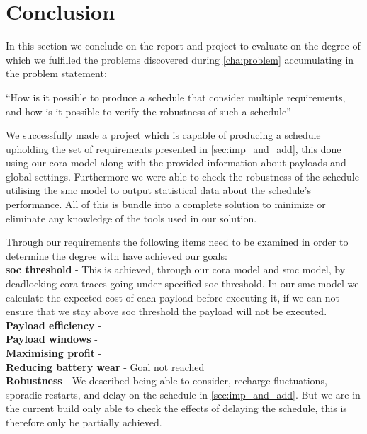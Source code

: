 \section{Conclusion} \label{sec:conclusion}
In this section we conclude on the report and project to evaluate on the degree of which we fulfilled the problems discovered during  \cref{cha:problem} accumulating in the problem statement:

\enquote{How is it possible to produce a schedule that consider multiple requirements, and how is it possible to verify the robustness of such a schedule}

We successfully made a project which is capable of producing a schedule upholding the set of requirements presented in \cref{sec:imp_and_add}, this done using our \gls{cora} model along with the provided information about payloads and global settings. Furthermore we were able to check the robustness of the schedule utilising the \gls{smc} model to output statistical data about the schedule's performance. All of this is bundle into a complete solution to minimize or eliminate any knowledge of the tools used in our solution.

Through our requirements the following items need to be examined in order to determine the degree with have achieved our goals: \\
\textbf{\Gls{soc} threshold} - This is achieved, through our \gls{cora} model and \gls{smc} model, by deadlocking \gls{cora} traces going under specified \gls{soc} threshold. In our \gls{smc} model we calculate the expected cost of each payload before executing it, if we can not ensure that we stay above \gls{soc} threshold the payload will not be executed.\\
\textbf{Payload efficiency} - \\
\textbf{Payload windows} - \\
\textbf{Maximising profit} - \\
\textbf{Reducing battery wear} - Goal not reached \\
\textbf{Robustness} - We described being able to consider, recharge fluctuations, sporadic restarts, and delay on the schedule in  \cref{sec:imp_and_add}. But we are in the current build only able to check the effects of delaying the schedule, this is therefore only be partially achieved.



